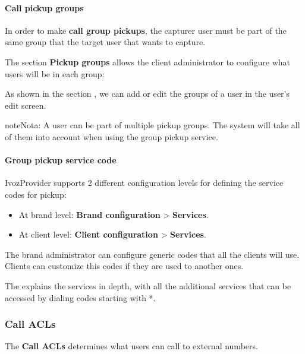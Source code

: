 \documentclass[letterpaper,10pt,spanish]{sphinxmanual}
\begin{document}
\paragraph{Call pickup groups}
\label{administration_portal/client/vpbx/user_configuration/pick_up_groups:call-pickup-groups}
In order to make \textbf{call group pickups}, the capturer user must be part of the
same group that the target user that wants to capture.

The section \textbf{Pickup groups} allows the client administrator to configure
what users will be in each group:

As shown in the section {\hyperref[administration_portal/client/vpbx/users:users]{}}, we can add or edit the groups of a user
in the user's edit screen.

\begin{notice}{note}{Nota:}
A user can be part of multiple pickup groups. The system will take
all of them into account when using the group pickup service.
\end{notice}


\paragraph{Group pickup service code}
\label{administration_portal/client/vpbx/user_configuration/pick_up_groups:group-pickup-service-code}
IvozProvider supports 2 different configuration levels for defining the service
codes for pickup:
\begin{itemize}
\item {} 
At brand level: \textbf{Brand configuration} \textgreater{} \textbf{Services}.

\item {} 
At client level: \textbf{Client configuration} \textgreater{} \textbf{Services}.

\end{itemize}

The brand administrator can configure generic codes that all the clients will
use. Clients can customize this codes if they are used to another ones.

The {\hyperref[administration_portal/client/vpbx/services:services]{}} explains the services in depth, with
all the additional services that can be accessed by dialing codes starting with
*.


\subsubsection{Call ACLs}
\label{administration_portal/client/vpbx/user_configuration/call_acls:call-permissions}\label{administration_portal/client/vpbx/user_configuration/call_acls::doc}\label{administration_portal/client/vpbx/user_configuration/call_acls:call-acls}
The \textbf{Call ACLs} determines what users can call to external numbers.
\end{document}
